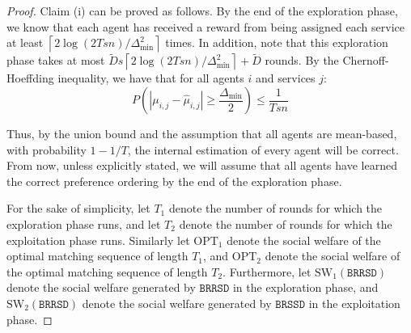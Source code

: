 \documentclass[letterpaper,11pt]{article}
\begin{document}
\begin{proof}
Claim (i) can be proved as follows. By the end of the exploration phase, we know that each agent has received a reward from being assigned each service at least $\left\lceil2\log(2Tsn)/\Delta_{\text{min}}^{2}\right\rceil$ times. In addition, note that this exploration phase takes at most $\tilde{D}s\left\lceil2\log(2Tsn)/\Delta_{\text{min}}^{2}\right\rceil + \tilde{D}$ rounds. By the Chernoff-Hoeffding inequality,  we have that for all agents $i$ and services $j$:
\begin{equation*}
    P\left(\left|\mu_{i, j} - \hat{\mu}_{i, j}\right| \geq \frac{\Delta_{\text{min}}}{2} \right) \leq \frac{1}{Tsn}
\end{equation*}

Thus, by the union bound and the assumption that all agents are mean-based, with probability $1 - 1/T$, the internal estimation of every agent will be correct. From now, unless explicitly stated, we will assume that all agents have learned the correct preference ordering by the end of the exploration phase. 

For the sake of simplicity, let $T_{1}$ denote the number of rounds for which the exploration phase runs, and let $T_{2}$ denote the number of rounds for which the exploitation phase runs. Similarly let $\textrm{OPT}_{1}$ denote the social welfare of the optimal matching sequence of length $T_{1}$, and $\textrm{OPT}_{2}$ denote the social welfare of the optimal matching sequence of length $T_{2}$. Furthermore, let $\textrm{SW}_{1}(\texttt{BRRSD})$ denote the social welfare generated by $\texttt{BRRSD}$ in the exploration phase, and $\textrm{SW}_{2}(\texttt{BRRSD})$ denote the social welfare generated by $\texttt{BRSSD}$ in the exploitation phase.


\end{proof}
\end{document}
